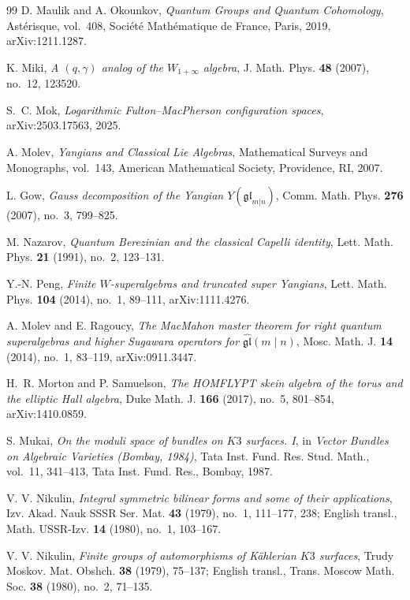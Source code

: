 \begin{thebibliography}{99}
D. Maulik and A. Okounkov, \emph{Quantum Groups and Quantum Cohomology}, Ast\'erisque, vol.~408, Soci\'et\'e Math\'ematique de France, Paris, 2019, arXiv:1211.1287.

K. Miki, \emph{A $(q,\gamma)$ analog of the $W_{1+\infty}$ algebra}, J. Math. Phys. \textbf{48} (2007), no.~12, 123520.

S.~C. Mok, \emph{Logarithmic Fulton--MacPherson configuration spaces}, arXiv:2503.17563, 2025.

A. Molev, \emph{Yangians and Classical Lie Algebras}, Mathematical Surveys and Monographs, vol.~143, American Mathematical Society, Providence, RI, 2007.

L. Gow, \emph{Gauss decomposition of the Yangian $Y(\mathfrak{gl}_{m|n})$}, Comm. Math. Phys. \textbf{276} (2007), no.~3, 799--825.

M. Nazarov, \emph{Quantum Berezinian and the classical Capelli identity}, Lett. Math. Phys. \textbf{21} (1991), no.~2, 123--131.

Y.-N. Peng, \emph{Finite $W$-superalgebras and truncated super Yangians}, Lett. Math. Phys. \textbf{104} (2014), no.~1, 89--111, arXiv:1111.4276.

A. Molev and E. Ragoucy, \emph{The MacMahon master theorem for right quantum superalgebras and higher Sugawara operators for $\widehat{\mathfrak{gl}}(m \mid n)$}, Mosc. Math. J. \textbf{14} (2014), no.~1, 83--119, arXiv:0911.3447.

H.~R. Morton and P. Samuelson, \emph{The HOMFLYPT skein algebra of the torus and the elliptic Hall algebra}, Duke Math. J. \textbf{166} (2017), no.~5, 801--854, arXiv:1410.0859.

S. Mukai, \emph{On the moduli space of bundles on $K3$ surfaces. I}, in \emph{Vector Bundles on Algebraic Varieties (Bombay, 1984)}, Tata Inst. Fund. Res. Stud. Math., vol.~11, 341--413, Tata Inst. Fund. Res., Bombay, 1987.

V. V. Nikulin, \emph{Integral symmetric bilinear forms and some of their applications}, Izv. Akad. Nauk SSSR Ser. Mat. \textbf{43} (1979), no.~1, 111--177, 238; English transl., Math. USSR-Izv. \textbf{14} (1980), no.~1, 103--167.

V. V. Nikulin, \emph{Finite groups of automorphisms of K\"ahlerian $K3$ surfaces}, Trudy Moskov. Mat. Obshch. \textbf{38} (1979), 75--137; English transl., Trans. Moscow Math. Soc. \textbf{38} (1980), no.~2, 71--135.


\end{thebibliography}
